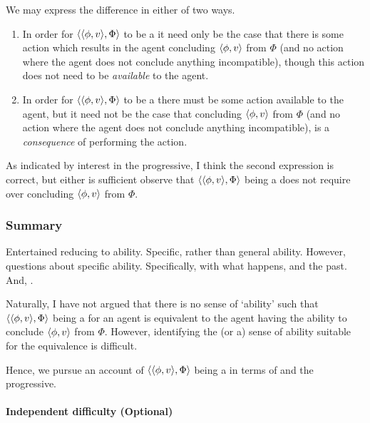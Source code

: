 \begin{note}
  We may express the difference in either of two ways.
  \begin{enumerate}[label=\arabic*.]
  \item
    In order for \(\langle \langle \phi, v \rangle, \Phi \rangle\) to be a \fc{} it need only be the case that there is some action which results in the agent concluding \(\langle \phi, v \rangle\) from \(\Phi\) (and no action where the agent does not conclude anything incompatible), though this action does not need to be \emph{available} to the agent.
  \item
    In order for \(\langle \langle \phi, v \rangle, \Phi \rangle\) to be a \fc{} there must be some action available to the agent, but it need not be the case that concluding \(\langle \phi, v \rangle\) from \(\Phi\) (and no action where the agent does not conclude anything incompatible), is a \emph{consequence} of performing the action.
  \end{enumerate}
  As indicated by interest in the progressive, I think the second expression is correct, but either is sufficient observe that \(\langle \langle \phi, v \rangle, \Phi \rangle\) being a \fc{} does not require \AbControl{} over concluding \(\langle \phi, v \rangle\) from \(\Phi\).
\end{note}

\subsubsection{Summary}

\begin{note}
  Entertained reducing  to ability.
  Specific, rather than general ability.
  However, questions about specific ability.
  Specifically, with what happens, and the past.
  And, \AbControl{}.
\end{note}

\begin{note}
  Naturally, I have not argued that there is no sense of `ability' such that \(\langle \langle \phi, v \rangle, \Phi \rangle\) being a  for an agent is equivalent to the agent having the ability to conclude \(\langle \phi, v \rangle\) from \(\Phi\).
  However, identifying the (or a) sense of ability suitable for the equivalence is difficult.

  Hence, we pursue an account of \(\langle \langle \phi, v \rangle, \Phi \rangle\) being a  in terms of  and the progressive.
\end{note}

\paragraph[Independent difficulty]{Independent difficulty \hfill (Optional)}

